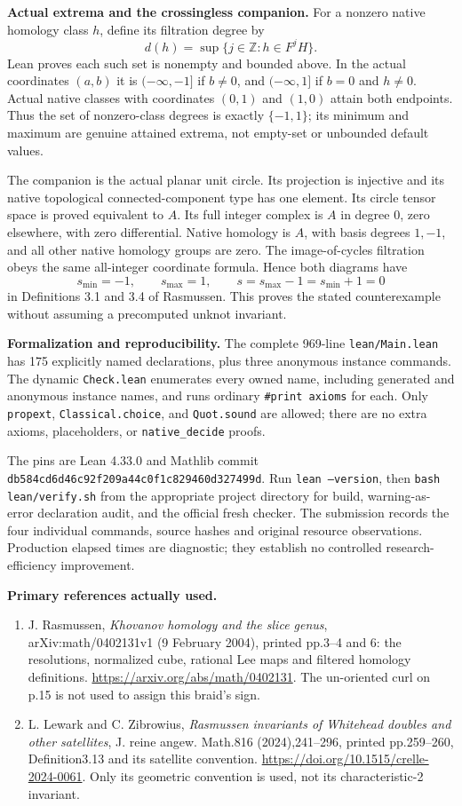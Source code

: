 \documentclass[11pt]{article}
\newcommand{\Z}{\mathbb Z}
\begin{document}
\newpage
\textbf{Actual extrema and the crossingless companion.}
For a nonzero native homology class $h$, define its filtration degree by
\[
 d(h)=\sup\{j\in\Z:h\in F^jH\}.
\]
Lean proves each such set is nonempty and bounded above. In the actual
coordinates $(a,b)$ it is $(-\infty,-1]$ if $b\ne0$, and $(-\infty,1]$
if $b=0$ and $h\ne0$. Actual native classes with coordinates $(0,1)$
and $(1,0)$ attain both endpoints. Thus the set of nonzero-class degrees
is exactly $\{-1,1\}$; its minimum and maximum are genuine attained
extrema, not empty-set or unbounded default values.

The companion is the actual planar unit circle. Its projection is
injective and its native topological connected-component type has one
element. Its circle tensor space is proved equivalent to $A$. Its full
integer complex is $A$ in degree 0, zero elsewhere, with zero differential.
Native homology is $A$, with basis degrees $1,-1$, and all other native
homology groups are zero. The image-of-cycles filtration obeys the same
all-integer coordinate formula. Hence both diagrams have
\[
 s_{\min}=-1,\qquad s_{\max}=1,\qquad
 s=s_{\max}-1=s_{\min}+1=0
\]
in Definitions 3.1 and 3.4 of Rasmussen. This proves the stated
counterexample without assuming a precomputed unknot invariant.

\textbf{Formalization and reproducibility.}
The complete 969-line \texttt{lean/Main.lean} has 175 explicitly named
declarations, plus three anonymous instance commands. The dynamic
\texttt{Check.lean} enumerates every owned name, including generated and
anonymous instance names, and runs ordinary \texttt{\#print axioms} for
each. Only \texttt{propext}, \texttt{Classical.choice}, and
\texttt{Quot.sound} are allowed; there are no extra axioms, placeholders,
or \texttt{native\_decide} proofs.

The pins are Lean 4.33.0 and Mathlib commit
\texttt{db584cd6d46c92f209a44c0f1c829460d327499d}.
Run \texttt{lean --version}, then \texttt{bash lean/verify.sh} from the
appropriate project directory for build, warning-as-error declaration
audit, and the official fresh checker. The submission records the four
individual commands, source hashes and original resource observations.
Production elapsed times are diagnostic; they establish no controlled
research-efficiency improvement.

\textbf{Primary references actually used.}
\begin{enumerate}
\item J. Rasmussen, \emph{Khovanov homology and the slice genus},
arXiv:math/0402131v1 (9 February 2004), printed pp.3--4 and 6:
the resolutions, normalized cube, rational Lee maps and filtered
homology definitions.
\url{https://arxiv.org/abs/math/0402131}.
The un-oriented curl on p.15 is not used to assign this braid's sign.
\item L. Lewark and C. Zibrowius, \emph{Rasmussen invariants of Whitehead
doubles and other satellites}, J. reine angew. Math.816 (2024),241--296,
printed pp.259--260, Definition3.13 and its satellite convention.
\url{https://doi.org/10.1515/crelle-2024-0061}.
Only its geometric convention is used, not its characteristic-2 invariant.
\end{enumerate}
\end{document}
